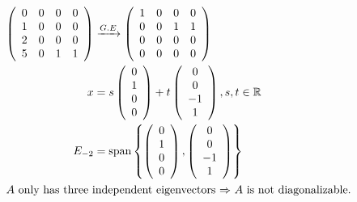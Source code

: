 \documentclass[12pt]{article}
\begin{document}
\begin{align*}
\left( \begin{array}{cccc}
0 & 0 & 0 & 0\\
1 & 0 & 0 & 0\\
2 & 0 & 0 & 0\\
5 & 0 & 1 & 1\\
\end{array} \right)
&\xrightarrow{G.E}
\left( \begin{array}{cccc}
1 & 0 & 0 & 0\\
0 & 0 & 1 & 1\\
0 & 0 & 0 & 0\\
0 & 0 & 0 & 0\\
\end{array} \right)\\
x &= 
s\left( \begin{array}{c}
0\\
1\\
0\\
0\\
\end{array} \right) + 
t\left( \begin{array}{c}
0\\
0\\
-1\\
1\\
\end{array} \right) , s , t \in \mathbb{R}\\
E_{-2} &= \text{span}\left\{
\left( \begin{array}{c}
0\\
1\\
0\\
0\\
\end{array} \right),
\left( \begin{array}{c}
0\\
0\\
-1\\
1\\
\end{array} \right)
 \right\} \\
\intertext{$A$ only has three independent eigenvectors $\Rightarrow$ $A$ is not diagonalizable.}
\end{align*}
\filbreak
\end{document}
